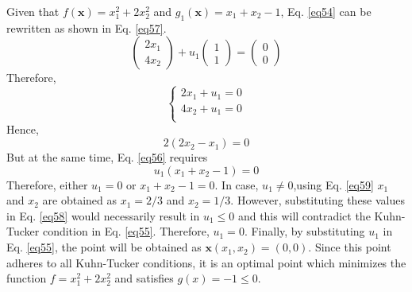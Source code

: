 Given that $f(\mathbf{x}) = x_1^2 + 2x_2^2$ and $g_1(\mathbf{x}) = x_1 + x_2 - 1$, Eq. \ref{eq54} can be rewritten as shown in Eq. \ref{eq57}.
\begin{equation}
\begin{pmatrix} 2x_1 \\ 4x_2 \end{pmatrix} + u_1 \begin{pmatrix} 1 \\ 1 \end{pmatrix} = \begin{pmatrix} 0 \\ 0 \end{pmatrix}
\label{eq57}
\end{equation}
Therefore,
\begin{equation}
\left\{ \begin{array}{ll} 2x_1+u_1 = 0\\ 4x_2 + u_1 = 0\\ \end{array}\right.
\label{eq58}
\end{equation}
Hence,
\begin{equation}
2(2x_2-x_1) = 0
\label{eq59}
\end{equation}
But at the same time, Eq. \ref{eq56} requires
\begin{equation}
u_1(x_1 + x_2 - 1) = 0
\label{eq60}
\end{equation}
Therefore, either $u_1 = 0$ or $x_1 + x_2 - 1 = 0$.
In case, $u_1 \neq 0$,using Eq. \ref{eq59} $x_1$ and $x_2$ are obtained as $x_1 = 2/3$ and $x_2 = 1/3$.
However, substituting these values in Eq. \ref{eq58} would necessarily result in $u_1 \leq 0$ and this will contradict the Kuhn-Tucker condition in Eq. \ref{eq55}.
Therefore, $u_1 = 0$.
Finally, by substituting $u_1$ in Eq. \ref{eq55}, the point will be obtained as $\mathbf{x}(x_1, x_2) = (0, 0)$.
Since this point adheres to all Kuhn-Tucker conditions, it is an optimal point which minimizes the function $f = x_1^2 + 2x_2^2$ and satisfies $g(x) = -1 \leq 0$.

